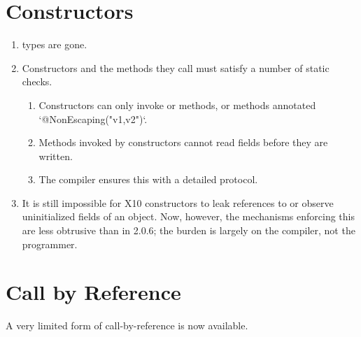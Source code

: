 \section{Constructors}


\begin{enumerate}
\item {} types are gone.
\item Constructors and the methods they call must satisfy a number of static
      checks.  
    
    \begin{enumerate}
    \item Constructors can only invoke  or  methods, 
          or methods annotated \xcd`@NonEscaping("v1,v2")`.  
    \item Methods invoked by constructors cannot read fields before they are
          written. 
    \item The compiler ensures this with a detailed protocol. 
    \end{enumerate}

\item It is still impossible for X10 constructors to leak references to
       or observe uninitialized fields of an object.  Now, however,
      the mechanisms enforcing this are less obtrusive than in 2.0.6; the
      burden is largely on the compiler, not the programmer.
\end{enumerate}




\section{Call by Reference}

A very limited form of call-by-reference is now available.


